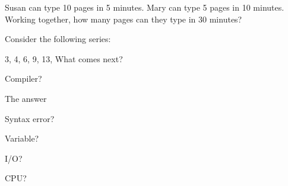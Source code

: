 \documentclass[11pt]{examdesign}
\begin{document}
\begin{multiplechoice}[title={Programming Apptitude},suppressprefix=no,rearrange=no]
\begin{question} 

Susan can type 10 pages in 5 minutes. Mary can type 5 pages
in 10 minutes. Working together, how many pages can they type in 30 minutes?

\end{question}

\begin{question}
Consider the following series:

3, 4, 6, 9, 13, \underline{\hspace*{1cm}} What comes next?

\end{question}

\end{multiplechoice}


\begin{shortanswer}[title={Define in a sentence (or two) the following terms?},
rearrange=no]

\begin{question}
Compiler?
\examvspace*{2cm}
\begin{answer}
The answer
\end{answer}
\end{question}

\begin{question}
Syntax error?
\examvspace*{2cm}
\end{question}


\begin{question}
Variable?
\examvspace*{2cm}
\end{question}

\begin{question}
I/O?
\examvspace*{2cm}
\end{question}

\begin{question}
CPU?
\examvspace*{2cm}
\end{question}

\end{shortanswer}
\end{document}
